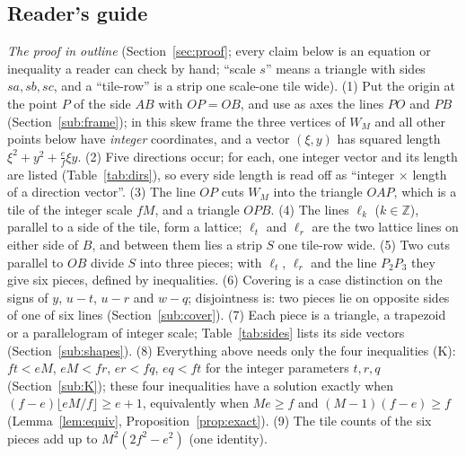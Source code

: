 \documentclass[11pt,reqno]{amsart}
\theoremstyle{plain}
\theoremstyle{definition}
\begin{document}
\subsection{Reader's guide}
\emph{The proof in outline} (Section~\ref{sec:proof}; every claim below is an equation or inequality a reader can check by hand; ``scale $s$'' means a triangle with sides $sa,sb,sc$, and a ``tile-row'' is a strip one scale-one tile wide).
(1) Put the origin at the point $P$ of the side $AB$ with $OP=OB$, and use as axes the lines $PO$ and $PB$ (Section~\ref{sub:frame}); in this skew frame the three vertices of $W_M$ and all other points below have \emph{integer} coordinates, and a vector $(\xi,y)$ has squared length $\xi^2+y^2+\tfrac ef\xi y$.
(2) Five directions occur; for each, one integer vector and its length are listed (Table~\ref{tab:dirs}), so every side length is read off as ``integer $\times$ length of a direction vector''.
(3) The line $OP$ cuts $W_M$ into the triangle $OAP$, which is a tile of the integer scale $fM$, and a triangle $OPB$.
(4) The lines $\ell_k$ ($k\in\mathbb Z$), parallel to a side of the tile, form a lattice; $\ell_t$ and $\ell_r$ are the two lattice lines on either side of $B$, and between them lies a strip $S$ one tile-row wide.
(5) Two cuts parallel to $OB$ divide $S$ into three pieces; with $\ell_t$, $\ell_r$ and the line $P_2P_3$ they give six pieces, defined by inequalities.
(6) Covering is a case distinction on the signs of $y$, $u-t$, $u-r$ and $w-q$; disjointness is: two pieces lie on opposite sides of one of six lines (Section~\ref{sub:cover}).
(7) Each piece is a triangle, a trapezoid or a parallelogram of integer scale; Table~\ref{tab:sides} lists its side vectors (Section~\ref{sub:shapes}).
(8) Everything above needs only the four inequalities (K): $ft<eM$, $eM<fr$, $er<fq$, $eq<ft$ for the integer parameters $t,r,q$ (Section~\ref{sub:K}); these four inequalities have a solution exactly when $(f-e)\lfloor eM/f\rfloor\ge e+1$, equivalently when $Me\ge f$ and $(M-1)(f-e)\ge f$ (Lemma~\ref{lem:equiv}, Proposition~\ref{prop:exact}).
(9) The tile counts of the six pieces add up to $M^2(2f^2-e^2)$ (one identity).
\end{document}
